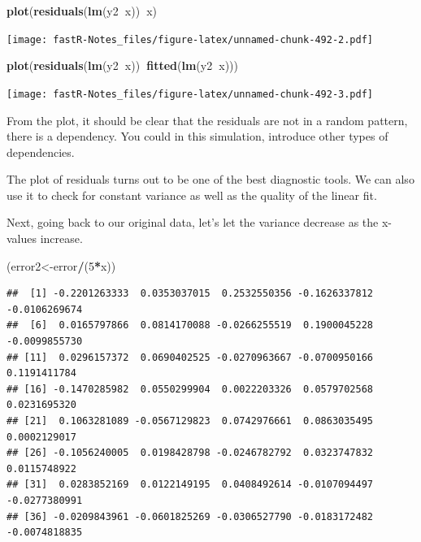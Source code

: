 \documentclass[]{book}
\newenvironment{Shaded}{\begin{snugshade}}{\end{snugshade}}
\newcommand{\KeywordTok}[1]{\textcolor[rgb]{0.13,0.29,0.53}{\textbf{#1}}}
\newcommand{\DecValTok}[1]{\textcolor[rgb]{0.00,0.00,0.81}{#1}}
\newcommand{\OperatorTok}[1]{\textcolor[rgb]{0.81,0.36,0.00}{\textbf{#1}}}
\newcommand{\NormalTok}[1]{#1}
\theoremstyle{definition}
\theoremstyle{definition}
\theoremstyle{definition}
\theoremstyle{remark}
\begin{document}
\begin{Shaded}
\begin{Highlighting}[]
\KeywordTok{plot}\NormalTok{(}\KeywordTok{residuals}\NormalTok{(}\KeywordTok{lm}\NormalTok{(y2}\OperatorTok{~}\NormalTok{x))}\OperatorTok{~}\NormalTok{x)}
\end{Highlighting}
\end{Shaded}

\texttt{[image: fastR-Notes\_files/figure-latex/unnamed-chunk-492-2.pdf]}

\begin{Shaded}
\begin{Highlighting}[]
\KeywordTok{plot}\NormalTok{(}\KeywordTok{residuals}\NormalTok{(}\KeywordTok{lm}\NormalTok{(y2}\OperatorTok{~}\NormalTok{x))}\OperatorTok{~}\KeywordTok{fitted}\NormalTok{(}\KeywordTok{lm}\NormalTok{(y2}\OperatorTok{~}\NormalTok{x)))}
\end{Highlighting}
\end{Shaded}

\texttt{[image: fastR-Notes\_files/figure-latex/unnamed-chunk-492-3.pdf]}

From the plot, it should be clear that the residuals are not in a random
pattern, there is a dependency. You could in this simulation, introduce
other types of dependencies.

The plot of residuals turns out to be one of the best diagnostic tools.
We can also use it to check for constant variance as well as the quality
of the linear fit.

Next, going back to our original data, let's let the variance decrease
as the x-values increase.

\begin{Shaded}
\begin{Highlighting}[]
\NormalTok{(error2<-error}\OperatorTok{/}\NormalTok{(}\DecValTok{5}\OperatorTok{*}\NormalTok{x))}
\end{Highlighting}
\end{Shaded}

\begin{verbatim}
##  [1] -0.2201263333  0.0353037015  0.2532550356 -0.1626337812 -0.0106269674
##  [6]  0.0165797866  0.0814170088 -0.0266255519  0.1900045228 -0.0099855730
## [11]  0.0296157372  0.0690402525 -0.0270963667 -0.0700950166  0.1191411784
## [16] -0.1470285982  0.0550299904  0.0022203326  0.0579702568  0.0231695320
## [21]  0.1063281089 -0.0567129823  0.0742976661  0.0863035495  0.0002129017
## [26] -0.1056240005  0.0198428798 -0.0246782792  0.0323747832  0.0115748922
## [31]  0.0283852169  0.0122149195  0.0408492614 -0.0107094497 -0.0277380991
## [36] -0.0209843961 -0.0601825269 -0.0306527790 -0.0183172482 -0.0074818835
\end{verbatim}
\end{document}
